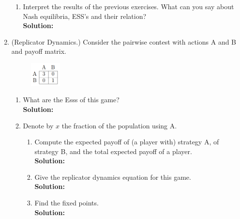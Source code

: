 \documentclass[a4paper]{article}
\begin{document}
\begin{enumerate}
\begin{enumerate}
		
		
		\item Interpret the results of the previous exercises. What can you say about Nash equilibria, ESS's and their relation?\\
		\textbf{Solution:}\\	
		
		
		
		
		
		
	\end{enumerate}
	
	\item(Replicator Dynamics.) Consider the pairwise contest with actions A and B and payoff matrix.
	
		\begin{figure}[H]
	    \centering
  	    \includegraphics[width=0.15\textwidth]{images/task2.PNG}
	    \end{figure}	
	
	
	\begin{enumerate}
		\item What are the Esss of this game?\\
		\textbf{Solution:}\\
		
		
		
		
		
		
		\item Denote by $x$ the fraction of the population using A.
			\begin{enumerate}
				\item Compute the expected payoff of (a player with) strategy A, of strategy B, and the total expected payoff of a player.\\
				\textbf{Solution:}\\
				
				
				
				
				\item Give the replicator dynamics equation for this game.\\
				\textbf{Solution:}\\
				
				
				
				
				
				\item Find the fixed points.\\
				\textbf{Solution:}\\
				

\end{enumerate}
\end{enumerate}
\end{enumerate}
\end{document}
